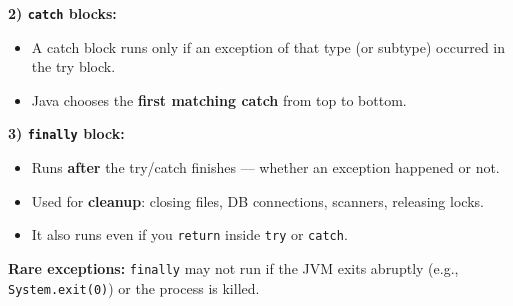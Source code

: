 \documentclass[11pt]{article}
\begin{document}
\textbf{2) \texttt{catch} blocks:}
\begin{itemize}
  \item A catch block runs only if an exception of that type (or subtype) occurred in the try block.
  \item Java chooses the \textbf{first matching catch} from top to bottom.
\end{itemize}

\textbf{3) \texttt{finally} block:}
\begin{itemize}
  \item Runs \textbf{after} the try/catch finishes --- whether an exception happened or not.
  \item Used for \textbf{cleanup}: closing files, DB connections, scanners, releasing locks.
  \item It also runs even if you \texttt{return} inside \texttt{try} or \texttt{catch}.
\end{itemize}
\textbf{Rare exceptions:} \texttt{finally} may not run if the JVM exits abruptly (e.g., \texttt{System.exit(0)}) or the process is killed.
\end{document}

